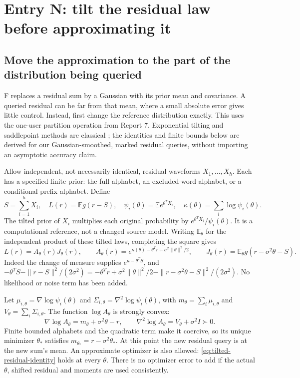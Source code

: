 \documentclass[10pt,a4paper]{article}
\newcommand{\E}{\mathbb E}
\begin{document}
\clearpage
\section{Entry N: tilt the residual law before approximating it}
\label{sec:tilted-residual}
\subsection{Move the approximation to the part of the distribution being queried}
F replaces a residual sum by a Gaussian with its prior mean and covariance. A queried residual can be far
from that mean, where a small absolute error gives little control. Instead, first change the reference
distribution exactly. This uses the one-user partition operation from Report 7. Exponential tilting and
saddlepoint methods are classical \cite{daniels}; the identities and finite bounds below are derived for
our Gaussian-smoothed, marked residual queries, without importing an asymptotic accuracy claim.

Allow independent, not necessarily identical, residual waveforms $X_1,\ldots,X_h$. Each has a specified
finite prior: the full alphabet, an excluded-word alphabet, or a conditional prefix alphabet. Define
\[
 S=\sum_{i=1}^hX_i,\quad L(r)=\E g(r-S),\quad
 \psi_i(\theta)=\E e^{\theta^TX_i},\quad
 \kappa(\theta)=\sum_i\log\psi_i(\theta).
\]
The tilted prior of $X_i$ multiplies each original probability by
$e^{\theta^TX_i}/\psi_i(\theta)$. It is a computational reference, not a changed source model.
Writing $\E_\theta$ for the independent product of these tilted laws, completing the square gives
\begin{equation}
 L(r)=A_\theta(r)J_\theta(r),\qquad
 A_\theta(r)=e^{\kappa(\theta)-\theta^Tr+\sigma^2\|\theta\|^2/2},\qquad
 J_\theta(r)=\E_\theta g(r-\sigma^2\theta-S).
 \label{eq:tilted-residual-identity}
\end{equation}
Indeed the change of measure supplies $e^{\kappa-\theta^TS}$, and
$-\theta^TS-\|r-S\|^2/(2\sigma^2)
=-\theta^Tr+\sigma^2\|\theta\|^2/2-\|r-\sigma^2\theta-S\|^2/(2\sigma^2)$.
No likelihood or noise term has been added.

Let $\mu_{i,\theta}=\nabla\log\psi_i(\theta)$ and
$\Sigma_{i,\theta}=\nabla^2\log\psi_i(\theta)$, with
$m_\theta=\sum_i\mu_{i,\theta}$ and $V_\theta=\sum_i\Sigma_{i,\theta}$.
The function $\log A_\theta$ is strongly convex:
\begin{equation}
 \nabla\log A_\theta=m_\theta+\sigma^2\theta-r,\qquad
 \nabla^2\log A_\theta=V_\theta+\sigma^2I\succ0.
 \label{eq:tilt-stationary}
\end{equation}
Finite bounded alphabets and the quadratic term make it coercive, so its unique minimizer $\theta_*$
satisfies $m_{\theta_*}=r-\sigma^2\theta_*$. At this point the new residual query is at the new sum's mean.
An approximate optimizer is also allowed: \eqref{eq:tilted-residual-identity} holds at every $\theta$.
There is no optimizer error to add if the actual $\theta$, shifted residual and moments are used consistently.
\end{document}

